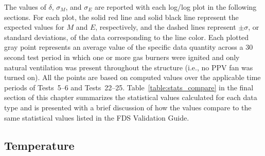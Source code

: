 The values of $\delta$, $\sigma_M$, and $\sigma_E$ are reported with each log/log plot in the following sections. For each plot, the solid red line and solid black line represent the expected values for $M$ and $E$, respectively, and the dashed lines represent $\pm \sigma$, or standard deviations, of the data corresponding to the line color. Each plotted gray point represents an average value of the specific data quantity across a 30 second test period in which one or more gas burners were ignited and only natural ventilation was present throughout the structure (i.e., no PPV fan was turned on). All the points are based on computed values over the applicable time periods of Tests~5--6 and Tests~22--25. Table~\ref{table:stats_compare} in the final section of this chapter summarizes the statistical values calculated for each data type and is presented with a brief discussion of how the values compare to the same statistical values listed in the FDS Validation Guide.

\subsection{Temperature}

